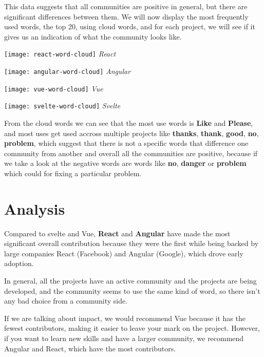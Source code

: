 This data suggests that all communities are positive in general, but there are significant differences between them. We will now display the most frequently used words, the top 20, using cloud words, and for each project, we will see if it gives us an indication of what the community looks like.

\begin{center}
    \texttt{[image: react-word-cloud]}    
    \textit{React}
\end{center}


\begin{center}
    \texttt{[image: angular-word-cloud]}    
    \textit{Angular}
\end{center}


\begin{center}
    \texttt{[image: vue-word-cloud]}    
    \textit{Vue}
\end{center}

\begin{center}
    \texttt{[image: svelte-word-cloud]}    
    \textit{Svelte}
\end{center}

From the cloud words we can see that the most use words is \textbf{Like} and \textbf{Please}, and most uses get used accross multiple projects like \textbf{thanks}, \textbf{thank}, \textbf{good}, \textbf{no}, \textbf{problem}, which suggest that there is not a specific words that difference one community from another and overall all the communities are positive, because if we take a look at the negative words are words like \textbf{no}, \textbf{danger} or \textbf{problem} which could for fixing a particular problem.

\section{Analysis}
Compared to svelte and Vue, \textbf{React} and \textbf{Angular} have made the most significant overall contribution because they were the first while being backed by large companies React (Facebook) and Angular (Google), which drove early adoption.

In general, all the projects have an active community and the projects are being developed, and the community seems to use the same kind of word, so there isn't any bad choice from a community side.

If we are talking about impact, we would recommend Vue because it has the fewest contributors, making it easier to leave your mark on the project. However, if you want to learn new skills and have a larger community, we recommend Angular and React, which have the most contributors.


